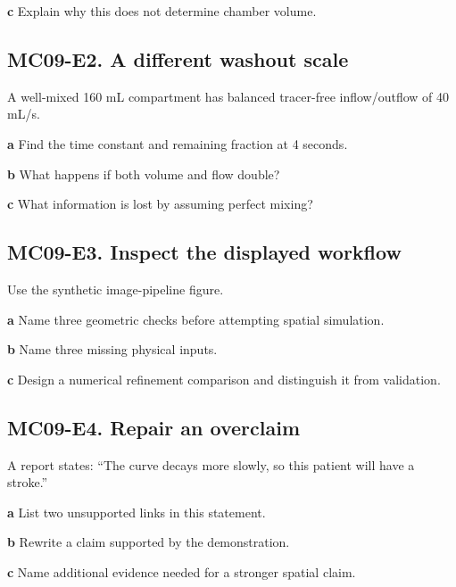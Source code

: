 \documentclass[11pt,letterpaper]{article}
\theoremstyle{definition}\newtheorem{definition}{Definition}\newtheorem{example}{Example}
\numberwithin{equation}{section}
\begin{document}
\textbf{c} Explain why this does not determine chamber volume.

\par\noindent\begin{minipage}{\linewidth}
\subsection*{MC09-E2. A different washout scale}
A well-mixed 160 mL compartment has balanced tracer-free inflow/outflow of 40 mL/s.

\textbf{a} Find the time constant and remaining fraction at 4 seconds.

\end{minipage}\par\medskip
\textbf{b} What happens if both volume and flow double?

\textbf{c} What information is lost by assuming perfect mixing?

\par\noindent\begin{minipage}{\linewidth}
\subsection*{MC09-E3. Inspect the displayed workflow}
Use the synthetic image-pipeline figure.

\textbf{a} Name three geometric checks before attempting spatial simulation.

\end{minipage}\par\medskip
\textbf{b} Name three missing physical inputs.

\textbf{c} Design a numerical refinement comparison and distinguish it from validation.

\par\noindent\begin{minipage}{\linewidth}
\subsection*{MC09-E4. Repair an overclaim}
A report states: ``The curve decays more slowly, so this patient will have a stroke.''

\textbf{a} List two unsupported links in this statement.

\end{minipage}\par\medskip
\textbf{b} Rewrite a claim supported by the demonstration.

\textbf{c} Name additional evidence needed for a stronger spatial claim.
\end{document}
